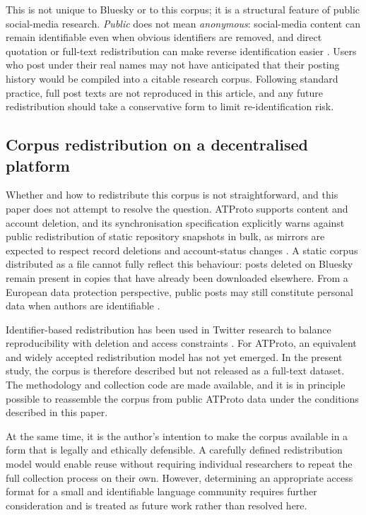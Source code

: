 This is not unique to Bluesky or to this corpus; it is a structural feature of public social-media research. \textit{Public} does not mean \textit{anonymous}: social-media content can remain identifiable even when obvious identifiers are removed, and direct quotation or full-text redistribution can make reverse identification easier \parencite{aoir2019internet,ayers2018dont}. Users who post under their real names may not have anticipated that their posting history would be compiled into a citable research corpus. Following standard practice, full post texts are not reproduced in this article, and any future redistribution should take a conservative form to limit re-identification risk.

\subsection{Corpus redistribution on a decentralised platform}

Whether and how to redistribute this corpus is not straightforward, and this paper does not attempt to resolve the question. ATProto supports content and account deletion, and its synchronisation specification explicitly warns against public redistribution of static repository snapshots in bulk, as mirrors are expected to respect record deletions and account-status changes \parencite{atproto-sync}. A static corpus distributed as a file cannot fully reflect this behaviour: posts deleted on Bluesky remain present in copies that have already been downloaded elsewhere. From a European data protection perspective, public posts may still constitute personal data when authors are identifiable \parencite{gdpr2016}.

Identifier-based redistribution has been used in Twitter research to balance reproducibility with deletion and access constraints \parencite{kinderkurlanda2017archiving}. For ATProto, an equivalent and widely accepted redistribution model has not yet emerged. In the present study, the corpus is therefore described but not released as a full-text dataset. The methodology and collection code are made available, and it is in principle possible to reassemble the corpus from public ATProto data under the conditions described in this paper.

At the same time, it is the author’s intention to make the corpus available in a form that is legally and ethically defensible. A carefully defined redistribution model would enable reuse without requiring individual researchers to repeat the full collection process on their own. However, determining an appropriate access format for a small and identifiable language community requires further consideration and is treated as future work rather than resolved here.
